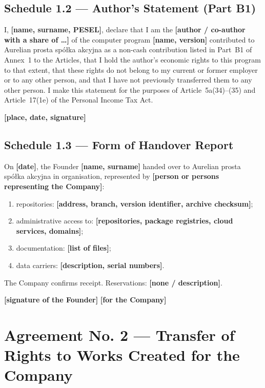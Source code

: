 \documentclass[12pt,a4paper]{report}
\newcounter{paragraf}
\newcommand{\field}[1]{\textbf{[#1]}}
\newcommand{\CompanyFull}{Aurelian prosta spółka akcyjna}
\begin{document}
\section*{Schedule 1.2 --- Author's Statement (Part B1)}

I, \field{name, surname, PESEL}, declare that I am the \field{author / co-author with a share of \ldots} of the computer program \field{name, version} contributed to \CompanyFull{} as a non-cash contribution listed in Part~B1 of Annex~1 to the Articles, that I hold the author's economic rights to this program to that extent, that these rights do not belong to my current or former employer or to any other person, and that I have not previously transferred them to any other person. I make this statement for the purposes of Article~5a(34)--(35) and Article~17(1e) of the Personal Income Tax Act.

\field{place, date, signature}

\section*{Schedule 1.3 --- Form of Handover Report}

On \field{date}, the Founder \field{name, surname} handed over to \CompanyFull{} in organisation, represented by \field{person or persons representing the Company}:

\begin{enumerate}
  \item repositories: \field{address, branch, version identifier, archive checksum};
  \item administrative access to: \field{repositories, package registries, cloud services, domains};
  \item documentation: \field{list of files};
  \item data carriers: \field{description, serial numbers}.
\end{enumerate}

The Company confirms receipt. Reservations: \field{none / description}.

\field{signature of the Founder} \hfill \field{for the Company}

\chapter*{Agreement No. 2 --- Transfer of Rights to Works Created for the Company}
\setcounter{paragraf}{0}
\end{document}
